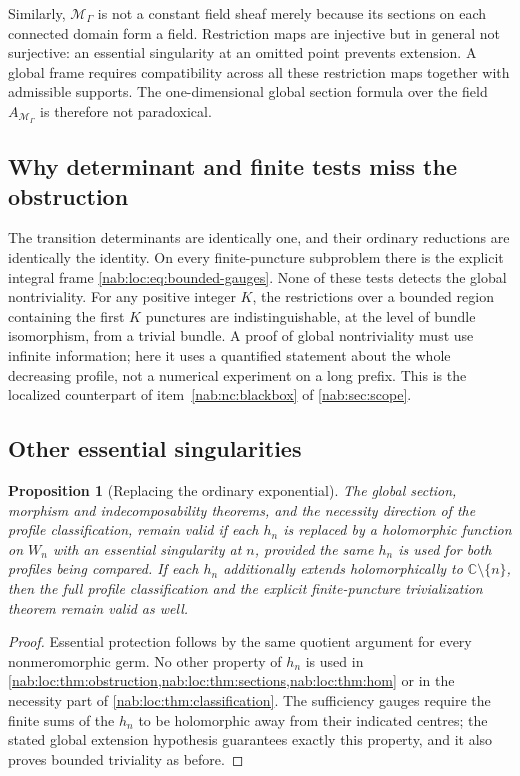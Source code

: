\documentclass[11pt,letterpaper]{article}
\newtheorem{proposition}[proposition]{Proposition}
\theoremstyle{definition}
\theoremstyle{remark}
\newcommand{\C}{\mathbb C}
\newcommand{\MM}{\mathscr M_\Gamma}
\numberwithin{equation}{section}
\begin{document}
Similarly, $\MM$ is not a constant field sheaf merely because its sections on
each connected domain form a field. Restriction maps are injective but in
general not surjective: an essential singularity at an omitted point prevents
extension. A global frame requires compatibility across all these restriction
maps together with admissible supports. The one-dimensional global section
formula over the field $A_{\MM}$ is therefore not paradoxical.

\subsection{Why determinant and finite tests miss the obstruction}

The transition determinants are identically one, and their ordinary reductions
are identically the identity. On every finite-puncture subproblem there is the
explicit integral frame \eqref{nab:loc:eq:bounded-gauges}. None of these tests
detects the global nontriviality. For any positive integer $K$, the
restrictions over a bounded region containing the first $K$ punctures are
indistinguishable, at the level of bundle isomorphism, from a trivial bundle. A
proof of global nontriviality must use infinite information; here it uses a
quantified statement about the whole decreasing profile, not a numerical
experiment on a long prefix. This is the localized counterpart of
item~\ref{nab:nc:blackbox} of \cref{nab:sec:scope}.

\subsection{Other essential singularities}

\begin{proposition}[Replacing the ordinary exponential]\label{nab:loc:prop:essential-family}
The global section, morphism and indecomposability theorems, and the necessity
direction of the profile classification, remain valid if each $h_n$ is replaced
by a holomorphic function on $W_n$ with an essential singularity at $n$,
provided the same $h_n$ is used for both profiles being compared. If each $h_n$
additionally extends holomorphically to $\C\setminus\{n\}$, then the full
profile classification and the explicit finite-puncture trivialization theorem
remain valid as well.
\end{proposition}

\begin{proof}
Essential protection follows by the same quotient argument for every
nonmeromorphic germ. No other property of $h_n$ is used in
\cref{nab:loc:thm:obstruction,nab:loc:thm:sections,nab:loc:thm:hom} or in the
necessity part of \cref{nab:loc:thm:classification}. The sufficiency gauges
require the finite sums of the $h_n$ to be holomorphic away from their
indicated centres; the stated global extension hypothesis guarantees exactly
this property, and it also proves bounded triviality as before.
\end{proof}
\end{document}
